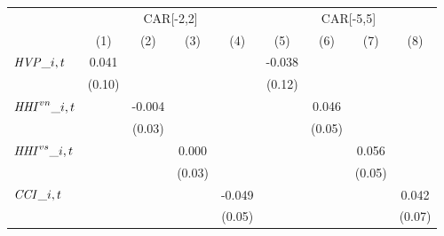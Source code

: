 {
\def\sym#1{\ifmmode^{#1}\else\(^{#1}\)\fi}
\begin{tabular}{l*{8}{c}}
\toprule
                    &\multicolumn{4}{c}{CAR[-2,2]}                                                          &\multicolumn{4}{c}{CAR[-5,5]}                                                          \\\cmidrule(lr){2-5}\cmidrule(lr){6-9}
                    &\multicolumn{1}{c}{(1)}         &\multicolumn{1}{c}{(2)}         &\multicolumn{1}{c}{(3)}         &\multicolumn{1}{c}{(4)}         &\multicolumn{1}{c}{(5)}         &\multicolumn{1}{c}{(6)}         &\multicolumn{1}{c}{(7)}         &\multicolumn{1}{c}{(8)}         \\
\midrule
${\it HVP}\_{i,t}$   &       0.041         &                     &                     &                     &      -0.038         &                     &                     &                     \\
                    &      (0.10)         &                     &                     &                     &      (0.12)         &                     &                     &                     \\
${\it HHI}^{vn}\_{i,t}$&                     &      -0.004         &                     &                     &                     &       0.046         &                     &                     \\
                    &                     &      (0.03)         &                     &                     &                     &      (0.05)         &                     &                     \\
${\it HHI}^{vs}\_{i,t}$&                     &                     &       0.000         &                     &                     &                     &       0.056         &                     \\
                    &                     &                     &      (0.03)         &                     &                     &                     &      (0.05)         &                     \\
${\it CCI}\_{i,t}$   &                     &                     &                     &      -0.049         &                     &                     &                     &       0.042         \\
                    &                     &                     &                     &      (0.05)         &                     &                     &                     &      (0.07)         \\

\end{tabular}}
